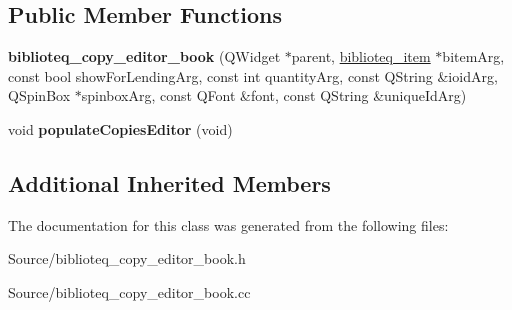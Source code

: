 \subsection*{Public Member Functions}
\begin{DoxyCompactItemize}
\item 
{\bfseries biblioteq\+\_\+copy\+\_\+editor\+\_\+book} (Q\+Widget $\ast$parent, \hyperlink{classbiblioteq__item}{biblioteq\+\_\+item} $\ast$bitem\+Arg, const bool show\+For\+Lending\+Arg, const int quantity\+Arg, const Q\+String \&ioid\+Arg, Q\+Spin\+Box $\ast$spinbox\+Arg, const Q\+Font \&font, const Q\+String \&unique\+Id\+Arg)\hypertarget{classbiblioteq__copy__editor__book_aa232a71e2c3367aff273d0f5549db642}{}\label{classbiblioteq__copy__editor__book_aa232a71e2c3367aff273d0f5549db642}

\item 
void {\bfseries populate\+Copies\+Editor} (void)\hypertarget{classbiblioteq__copy__editor__book_a65d55067596ac47f73bee0ea9af3df31}{}\label{classbiblioteq__copy__editor__book_a65d55067596ac47f73bee0ea9af3df31}

\end{DoxyCompactItemize}
\subsection*{Additional Inherited Members}


The documentation for this class was generated from the following files\+:\begin{DoxyCompactItemize}
\item 
Source/biblioteq\+\_\+copy\+\_\+editor\+\_\+book.\+h\item 
Source/biblioteq\+\_\+copy\+\_\+editor\+\_\+book.\+cc\end{DoxyCompactItemize}
